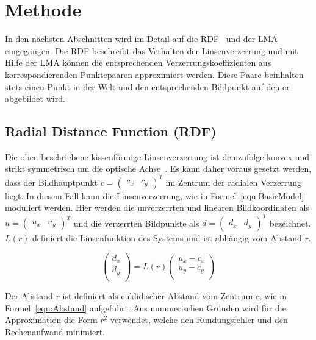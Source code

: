 
\section{Methode}
\label{Methode}
In den nächsten Abschnitten wird im Detail auf die RDF~\cite{HartleyRadDist} und der LMA~\cite{LevMarquardt} eingegangen. Die RDF beschreibt das Verhalten der Linsenverzerrung und mit Hilfe der LMA können die entsprechenden Verzerrungskoeffizienten aus korrespondierenden Punktepaaren  approximiert werden. Diese Paare beinhalten stets einen Punkt in der Welt und den entsprechenden Bildpunkt auf den er abgebildet wird.

\subsection{Radial Distance Function (RDF)}
\label{sec:RDF}
Die oben beschriebene kissenförmige Linsenverzerrung ist demzufolge konvex und strikt symmetrisch um die optische Achse~\cite{WengRadDist}. Es kann daher voraus gesetzt werden, dass der Bildhauptpunkt $c= \begin{pmatrix}
c_x & c_y
\end{pmatrix}^T$ im Zentrum der radialen Verzerrung liegt. In diesem Fall kann die Linsenverzerrung, wie in Formel~\ref{equ:BasicModel} moduliert werden. Hier werden die unverzerrten und linearen Bildkoordinaten als $u= \begin{pmatrix}
u_x & u_y
\end{pmatrix}^T$ und die verzerrten Bildpunkte als $d= \begin{pmatrix}
d_x & d_y
\end{pmatrix}^T$ bezeichnet. $L(r)$ definiert die Linsenfunktion des Systems und ist abhängig vom Abstand $r$.

\begin{equation}
\label{equ:BasicModel}
\begin{pmatrix}
d_x \\
d_y\\
\end{pmatrix} =
L(r)
\begin{pmatrix}
u_x-c_x\\
u_y -c_y\\
\end{pmatrix}
\end{equation}

Der Abstand $r$ ist definiert als euklidischer Abstand vom Zentrum $c$, wie in Formel~\ref{equ:Abstand} aufgeführt. Aus nummerischen Gründen wird für die Approximation die Form $r^2$ verwendet, welche den Rundungsfehler und den Rechenaufwand minimiert. 

